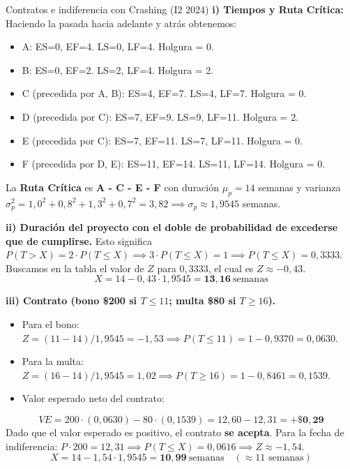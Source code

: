 \begin{ejercicio}{Contratos e indiferencia con Crashing (I2 2024)}
\textbf{i) Tiempos y Ruta Crítica:}
Haciendo la pasada hacia adelante y atrás obtenemos:
\begin{itemize}
  \item A: ES=0, EF=4. LS=0, LF=4. Holgura = 0.
  \item B: ES=0, EF=2. LS=2, LF=4. Holgura = 2.
  \item C (precedida por A, B): ES=4, EF=7. LS=4, LF=7. Holgura = 0.
  \item D (precedida por C): ES=7, EF=9. LS=9, LF=11. Holgura = 2.
  \item E (precedida por C): ES=7, EF=11. LS=7, LF=11. Holgura = 0.
  \item F (precedida por D, E): ES=11, EF=14. LS=11, LF=14. Holgura = 0.
\end{itemize}
La \textbf{Ruta Crítica} es \textbf{A - C - E - F} con duración $\mu_p = 14$ semanas y varianza $\sigma_p^2 = 1{,}0^2 + 0{,}8^2 + 1{,}3^2 + 0{,}7^2 = 3{,}82 \implies \sigma_p \approx 1{,}9545$ semanas.

\textbf{ii) Duración del proyecto con el doble de probabilidad de excederse que de cumplirse.}
Esto significa $P(T > X) = 2 \cdot P(T \le X) \implies 3 \cdot P(T \le X) = 1 \implies P(T \le X) = 0{,}3333$.
Buscamos en la tabla el valor de $Z$ para $0{,}3333$, el cual es $Z \approx -0{,}43$.
\[
  X = 14 - 0{,}43 \cdot 1{,}9545 = \mathbf{13{,}16}\ \text{semanas}
\]

\textbf{iii) Contrato (bono \$200 si $T \le 11$; multa \$80 si $T \ge 16$).}
\begin{itemize}
  \item Para el bono: $Z = (11 - 14)/1{,}9545 = -1{,}53 \implies P(T \le 11) = 1 - 0{,}9370 = 0{,}0630$.
  \item Para la multa: $Z = (16 - 14)/1{,}9545 = 1{,}02 \implies P(T \ge 16) = 1 - 0{,}8461 = 0{,}1539$.
  \item Valor esperado neto del contrato:
\end{itemize}
  \[
    VE = 200 \cdot (0{,}0630) - 80 \cdot (0{,}1539) = 12{,}60 - 12{,}31 = \mathbf{+\$0{,}29}
  \]
  Dado que el valor esperado es positivo, el contrato \textbf{se acepta}.
  Para la fecha de indiferencia: $P \cdot 200 = 12{,}31 \implies P(T \le X) = 0{,}0616 \implies Z \approx -1{,}54$.
  \[
    X = 14 - 1{,}54 \cdot 1{,}9545 = \mathbf{10{,}99}\ \text{semanas} \quad (\approx 11 \text{ semanas})
  \]


\end{ejercicio}
